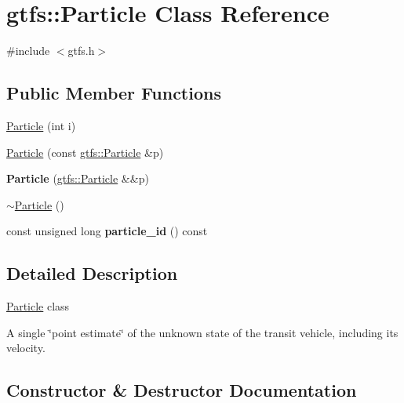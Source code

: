 \hypertarget{classgtfs_1_1Particle}{}\section{gtfs\+:\+:Particle Class Reference}
\label{classgtfs_1_1Particle}


{\ttfamily \#include $<$gtfs.\+h$>$}

\subsection*{Public Member Functions}
\begin{DoxyCompactItemize}
\item 
\hyperlink{classgtfs_1_1Particle_a1b5b0b92c1fdd22dd500059409076c3e}{Particle} (int i)
\item 
\hyperlink{classgtfs_1_1Particle_a9b2546360867281901bed0f731b90153}{Particle} (const \hyperlink{classgtfs_1_1Particle}{gtfs\+::\+Particle} \&p)
\item 
{\bfseries Particle} (\hyperlink{classgtfs_1_1Particle}{gtfs\+::\+Particle} \&\&p)\hypertarget{classgtfs_1_1Particle_a5959870395cc246c105251a6a09e0d81}{}\label{classgtfs_1_1Particle_a5959870395cc246c105251a6a09e0d81}

\item 
\hyperlink{classgtfs_1_1Particle_a3accf3496ad8460b4ad8b3f6da2de411}{$\sim$\+Particle} ()
\item 
const unsigned long {\bfseries particle\+\_\+id} () const \hypertarget{classgtfs_1_1Particle_a4c02d3ea318b8f88c30a6fa32dc7f727}{}\label{classgtfs_1_1Particle_a4c02d3ea318b8f88c30a6fa32dc7f727}

\end{DoxyCompactItemize}


\subsection{Detailed Description}
\hyperlink{classgtfs_1_1Particle}{Particle} class

A single \char`\"{}point estimate\char`\"{} of the unknown state of the transit vehicle, including its velocity. 

\subsection{Constructor \& Destructor Documentation}
